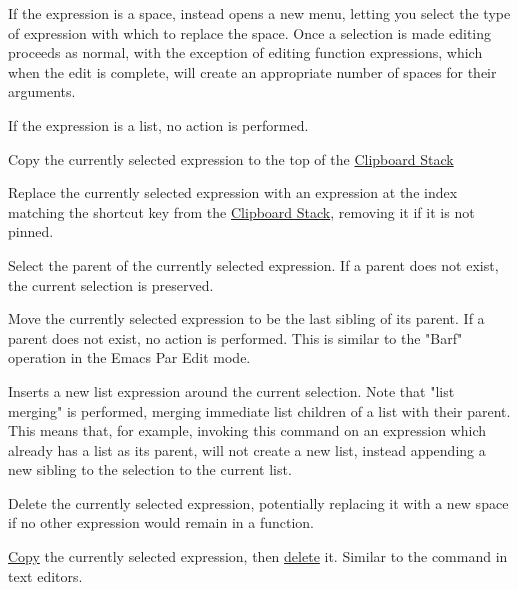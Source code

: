 If the expression is a space, instead opens a new menu,
letting you select the type of expression with which to replace the space. 
Once a selection is made editing proceeds as normal, with the exception of
editing function expressions, which when the edit is complete, will create
an appropriate number of spaces for their arguments.

If the expression is a list, no action is performed.


Copy the currently selected expression to the top of the
\hyperref[soln:clipboard_list]{Clipboard Stack}

Replace the currently selected expression with an expression at the index
matching the shortcut key from the
\hyperref[soln:clipboard_list]{Clipboard Stack}, removing it if it is not
pinned.

Select the parent of the currently selected expression. If a parent does not
exist, the current selection is preserved.

Move the currently selected expression to be the last sibling of its parent.
If a parent does not exist, no action is performed.
This is similar to the "Barf" operation in the Emacs Par Edit mode.


Inserts a new list expression around the current selection. Note that "list
merging" is performed, merging immediate list children of a list with their
parent. This means that, for example, invoking this command on an expression
which already has a list as its parent, will not create a new list, instead
appending a new sibling to the selection to the current list.

Delete the currently selected expression, potentially replacing it with a new
space if no other expression would remain in a function.


\hyperref[cmd:copy]{Copy} the currently selected expression, then
\hyperref[cmd:delete]{delete} it. Similar to the  command in
text editors.


